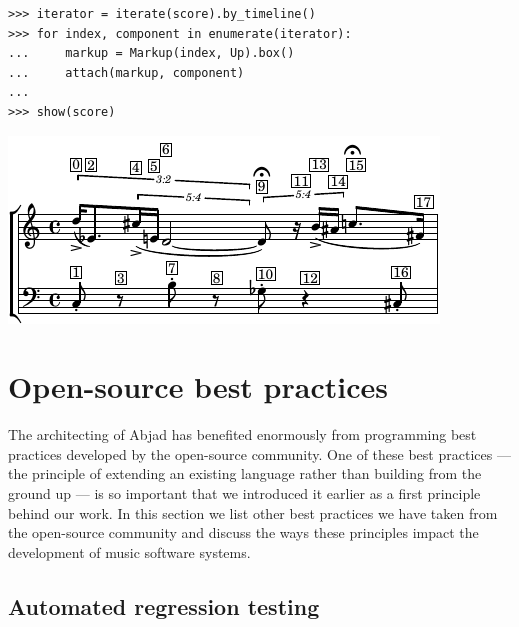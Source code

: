\documentclass{article}
\begin{document}

\begin{lstlisting}
>>> iterator = iterate(score).by_timeline()
>>> for index, component in enumerate(iterator):
...     markup = Markup(index, Up).box()
...     attach(markup, component)
...
>>> show(score)
\end{lstlisting}
\includegraphics{assets/lilypond-3eefc169b782de95b400a81c4546bdd6.pdf}

\section{Open-source best practices} \label{sec:open-source}

The architecting of Abjad has benefited enormously from programming best
practices developed by the open-source community. One of these best practices
--- the principle of extending an existing language rather than building from
the ground up --- is so important that we introduced it earlier as a first
principle behind our work. In this section we list other best practices we have
taken from the open-source community and discuss the ways these principles
impact the development of music software systems.

\subsection{Automated regression testing}
\end{document}
